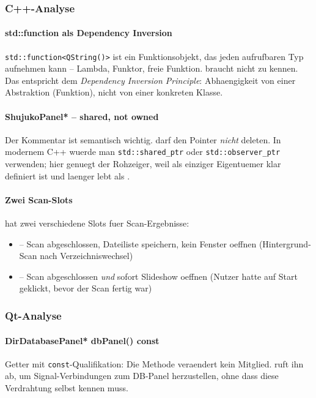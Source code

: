 \subsubsection{C++-Analyse}

\paragraph{std::function als Dependency Inversion}
\verb|std::function<QString()>| ist ein Funktionsobjekt,
das jeden aufrufbaren Typ aufnehmen kann -- Lambda, Funktor,
freie Funktion.  braucht
 nicht zu kennen.
Das entspricht dem \emph{Dependency Inversion Principle}:
Abhaengigkeit von einer Abstraktion (Funktion), nicht von
einer konkreten Klasse.

\paragraph{ShujukoPanel* -- shared, not owned}
Der Kommentar ist semantisch wichtig.
 darf den Pointer \emph{nicht} deleten.
In modernem C++ wuerde man \verb|std::shared_ptr|
oder \verb|std::observer_ptr| verwenden; hier genuegt der
Rohzeiger, weil  als einziger
Eigentuemer klar definiert ist und laenger lebt als
.

\paragraph{Zwei Scan-Slots}
 hat zwei verschiedene Slots fuer
Scan-Ergebnisse:
\begin{itemize}[noitemsep]
  \item {} -- Scan abgeschlossen, Dateiliste
    speichern, kein Fenster oeffnen (Hintergrund-Scan
    nach Verzeichniswechsel)
  \item {} -- Scan abgeschlossen
    \emph{und} sofort Slideshow oeffnen (Nutzer hatte auf
    Start geklickt, bevor der Scan fertig war)
\end{itemize}

\subsubsection{Qt-Analyse}

\paragraph{DirDatabasePanel* dbPanel() const}
Getter mit \verb|const|-Qualifikation: Die Methode
veraendert kein Mitglied.  ruft ihn
ab, um Signal-Verbindungen zum DB-Panel herzustellen,
ohne dass  diese Verdrahtung selbst
kennen muss.

